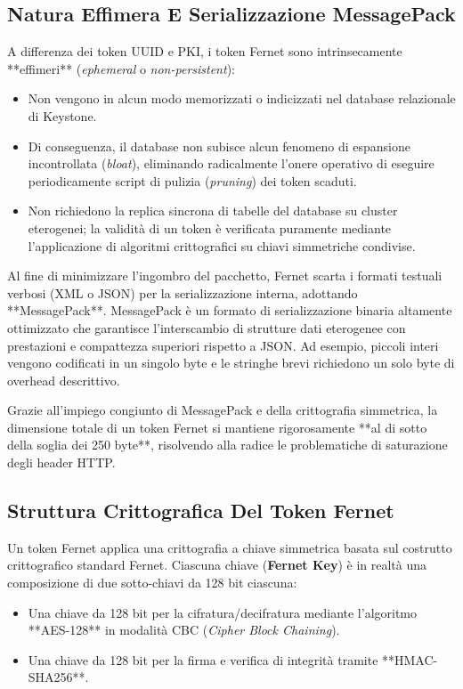 \documentclass[11pt, a4paper]{article}
\begin{document}
\subsection{Natura Effimera E Serializzazione MessagePack}

A differenza dei token UUID e PKI, i token Fernet sono intrinsecamente **effimeri** (\emph{ephemeral} o \emph{non-persistent}):
\begin{itemize}[noitemsep]
    \item Non vengono in alcun modo memorizzati o indicizzati nel database relazionale di Keystone.
    \item Di conseguenza, il database non subisce alcun fenomeno di espansione incontrollata (\emph{bloat}), eliminando radicalmente l'onere operativo di eseguire periodicamente script di pulizia (\emph{pruning}) dei token scaduti.
    \item Non richiedono la replica sincrona di tabelle del database su cluster eterogenei; la validità di un token è verificata puramente mediante l'applicazione di algoritmi crittografici su chiavi simmetriche condivise.
\end{itemize}

Al fine di minimizzare l'ingombro del pacchetto, Fernet scarta i formati testuali verbosi (XML o JSON) per la serializzazione interna, adottando **MessagePack**. MessagePack è un formato di serializzazione binaria altamente ottimizzato che garantisce l'interscambio di strutture dati eterogenee con prestazioni e compattezza superiori rispetto a JSON. Ad esempio, piccoli interi vengono codificati in un singolo byte e le stringhe brevi richiedono un solo byte di overhead descrittivo.


Grazie all'impiego congiunto di MessagePack e della crittografia simmetrica, la dimensione totale di un token Fernet si mantiene rigorosamente **al di sotto della soglia dei 250 byte**, risolvendo alla radice le problematiche di saturazione degli header HTTP.

\subsection{Struttura Crittografica Del Token Fernet}

Un token Fernet applica una crittografia a chiave simmetrica basata sul costrutto crittografico standard Fernet. Ciascuna chiave (\textbf{Fernet Key}) è in realtà una composizione di due sotto-chiavi da 128 bit ciascuna:
\begin{itemize}[noitemsep]
    \item Una chiave da 128 bit per la cifratura/decifratura mediante l'algoritmo **AES-128** in modalità CBC (\emph{Cipher Block Chaining}).
    \item Una chiave da 128 bit per la firma e verifica di integrità tramite **HMAC-SHA256**.
\end{itemize}
\end{document}
